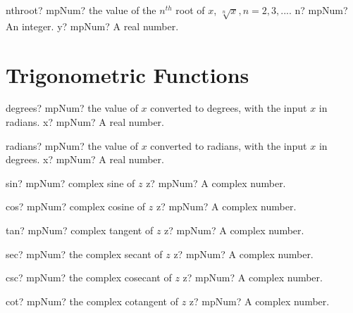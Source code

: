 \documentclass[12pt,a4paper,openany]{book}
\begin{document}
\begin{mpFunctionsExtract}
\mpFunctionTwo
{nthroot? mpNum? the value of the $n^{th}$ root of $x$, $\sqrt[n]{x}, n=2,3,...$.}
{n? mpNum? An integer.}
{y? mpNum? A real number.}
\end{mpFunctionsExtract}

\section{Trigonometric Functions}

\begin{mpFunctionsExtract}
\mpFunctionOne
{degrees? mpNum? the value of $x$ converted to degrees, with the input $x$ in radians.}
{x? mpNum? A real number.}
\end{mpFunctionsExtract}

\begin{mpFunctionsExtract}
\mpFunctionOne
{radians? mpNum? the value of $x$ converted to radians, with the input $x$ in degrees.}
{x? mpNum? A real number.}
\end{mpFunctionsExtract}

\begin{mpFunctionsExtract}
\mpFunctionOne
{sin? mpNum? complex sine of $z$}
{z? mpNum? A complex number.}
\end{mpFunctionsExtract}

\begin{mpFunctionsExtract}
\mpFunctionOne
{cos? mpNum? complex cosine of $z$}
{z? mpNum? A complex number.}
\end{mpFunctionsExtract}

\begin{mpFunctionsExtract}
\mpFunctionOne
{tan? mpNum? complex tangent of $z$}
{z? mpNum? A complex number.}
\end{mpFunctionsExtract}

\begin{mpFunctionsExtract}
\mpFunctionOne
{sec? mpNum? the complex secant of $z$}
{z? mpNum? A complex number.}
\end{mpFunctionsExtract}

\begin{mpFunctionsExtract}
\mpFunctionOne
{csc? mpNum? the complex cosecant of $z$}
{z? mpNum? A complex number.}
\end{mpFunctionsExtract}

\begin{mpFunctionsExtract}
\mpFunctionOne
{cot? mpNum? the complex cotangent of $z$}
{z? mpNum? A complex number.}
\end{mpFunctionsExtract}
\end{document}
